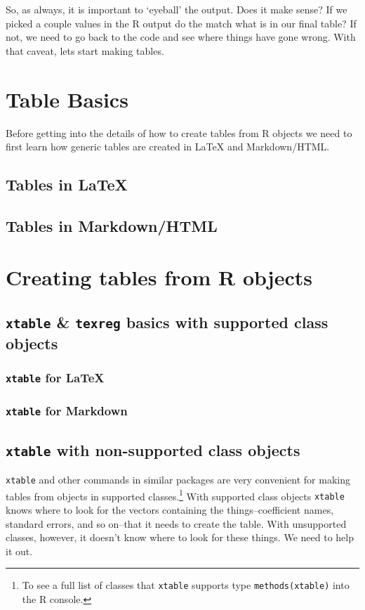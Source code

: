 So, as always, it is important to `eyeball' the output. Does it make
sense? If we picked a couple values in the R output do the
match what is in our final table? If not, we need to go back to the code
and see where things have gone wrong. With that caveat, lets start
making tables.

\section{Table Basics}

Before getting into the details of how to create tables from R objects we need to first learn how generic tables are created in LaTeX and Markdown/HTML.

\subsection{Tables in LaTeX}

\subsection{Tables in Markdown/HTML}

\section{Creating tables from R objects}

\subsection{\texttt{xtable} \& \texttt{texreg} basics with supported
class objects}

\subsubsection{\texttt{xtable} for LaTeX}

\subsubsection{\texttt{xtable} for Markdown}

\subsection{\texttt{xtable} with non-supported class objects}

{\tt{xtable}} and other commands in similar packages are very convenient for making tables from objects in supported classes.\footnote{To see a full list of classes that {\tt{xtable}} supports type {\tt{methods(xtable)}} into the R console.} With supported class objects {\tt{xtable}} knows where to look for the vectors containing the things--coefficient names, standard errors, and so on--that it needs to create the table. With unsupported classes, however, it doesn't know where to look for these things. We need to help it out. 

